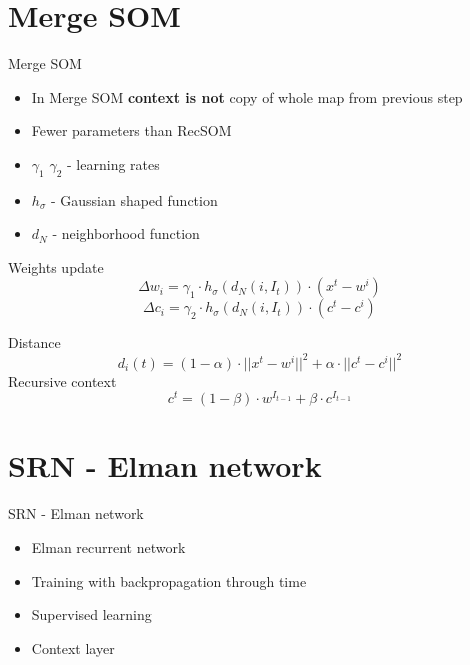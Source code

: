 \documentclass[10pt]{beamer}
\begin{document}
\section{Merge SOM}

\begin{frame}[fragile]{Merge SOM}

\begin{itemize}
\item In Merge SOM \textbf{context is not} copy of whole map from previous step
\item Fewer parameters than RecSOM
\item $\gamma_1$ $\gamma_2$ - learning rates
\item $h_{\sigma}$ - Gaussian shaped function
\item $d_N$ - neighborhood function
\end{itemize}
Weights update
\begin{equation*}
\Delta w_i = \gamma_{1} \cdot h_{\sigma}(d_{N}(i, I_{t})) \cdot (x^t - w^i)
\end{equation*}
\begin{equation*}
\Delta c_i = \gamma_{2} \cdot h_{\sigma}(d_{N}(i, I_{t})) \cdot (c^t - c^i)
\end{equation*}

Distance
\begin{equation*}
d_i(t) = (1-\alpha) \cdot ||x^t - w^i||^2 + \alpha \cdot ||c^t - c^i||^2
\end{equation*}
Recursive context
\begin{equation*}
c^t = (1 - \beta) \cdot w^{I_{t-1}} + \beta \cdot c^{I_{t-1}}
\end{equation*}

\end{frame}

\section{SRN - Elman network}

\begin{frame}[fragile]{SRN - Elman network}

\begin{itemize}
\item Elman recurrent network
\item Training with backpropagation through time
\item Supervised learning
\item Context layer 
\end{itemize}

\end{frame}
\end{document}
